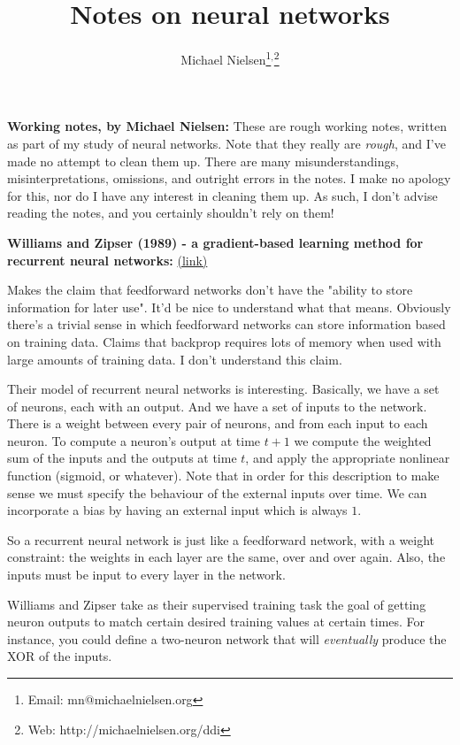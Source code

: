 \documentclass[12pt]{article}
\newcommand{\link}[2]{\href{#1}{#2}}
\begin{document}
\title{Notes on neural networks}
\author{Michael Nielsen\thanks{Email: mn@michaelnielsen.org}$^{,}$\thanks{Web: http://michaelnielsen.org/ddi}}

\maketitle

\textbf{Working notes, by Michael Nielsen:} These are rough working
notes, written as part of my study of neural networks.  Note that they
really are \emph{rough}, and I've made no attempt to clean them up.
There are many misunderstandings, misinterpretations, omissions, and
outright errors in the notes.  I make no apology for this, nor do I
have any interest in cleaning them up. As such, I don't advise reading
the notes, and you certainly shouldn't rely on them!

\textbf{Williams and Zipser (1989) - a gradient-based learning method
  for recurrent neural networks:}
\link{http://scholar.google.ca/scholar?cluster=1352799553544912946\&hl=en\&as\_sdt=0,5}{(link)}
  
  Makes the claim that feedforward networks don't have the "ability to
  store information for later use".  It'd be nice to understand what
  that means.  Obviously there's a trivial sense in which feedforward
  networks can store information based on training data.  Claims that
  backprop requires lots of memory when used with large amounts of
  training data.  I don't understand this claim.
  
  Their model of recurrent neural networks is interesting.  Basically,
  we have a set of neurons, each with an output.  And we have a set of
  inputs to the network.  There is a weight between every pair of
  neurons, and from each input to each neuron.  To compute a neuron's
  output at time $t+1$ we compute the weighted sum of the inputs and
  the outputs at time $t$, and apply the appropriate nonlinear
  function (sigmoid, or whatever).  Note that in order for this
  description to make sense we must specify the behaviour of the
  external inputs over time.  We can incorporate a bias by having an
  external input which is always $1$.
  
  So a recurrent neural network is just like a feedforward network,
  with a weight constraint: the weights in each layer are the same,
  over and over again.  Also, the inputs must be input to every layer
  in the network.
  
  Williams and Zipser take as their supervised training task the goal
  of getting neuron outputs to match certain desired training values
  at certain times.  For instance, you could define a two-neuron
  network that will \emph{eventually} produce the XOR of the inputs.
  
\end{document}

